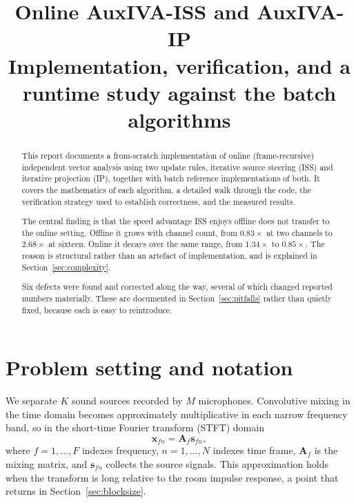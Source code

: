 \documentclass[11pt,a4paper]{article}
\title{\textbf{Online AuxIVA-ISS and AuxIVA-IP}\\[0.3em]
\large Implementation, verification, and a runtime study against the batch algorithms}
\author{}
\date{}
\newcommand{\x}{\boldsymbol{x}}
\begin{document}
\maketitle
\vspace{-2.5em}

\begin{abstract}
\noindent
This report documents a from-scratch implementation of online (frame-recursive)
independent vector analysis using two update rules, iterative source steering
(ISS) and iterative projection (IP), together with batch reference
implementations of both. It covers the mathematics of each algorithm, a detailed
walk through the code, the verification strategy used to establish correctness,
and the measured results.

The central finding is that the speed advantage ISS enjoys offline does not
transfer to the online setting. Offline it grows with channel count, from
$0.83\times$ at two channels to $2.68\times$ at sixteen. Online it decays over
the same range, from $1.34\times$ to $0.85\times$. The reason is structural
rather than an artefact of implementation, and is explained in
Section~\ref{sec:complexity}.

Six defects were found and corrected along the way, several of which changed
reported numbers materially. These are documented in Section~\ref{sec:pitfalls}
rather than quietly fixed, because each is easy to reintroduce.
\end{abstract}

\tableofcontents

\section{Problem setting and notation}

We separate $K$ sound sources recorded by $M$ microphones. Convolutive mixing in
the time domain becomes approximately multiplicative in each narrow frequency
band, so in the short-time Fourier transform (STFT) domain
%
\begin{equation}
\x_{fn} = \boldsymbol{A}_f \boldsymbol{s}_{fn},
\end{equation}
%
where $f = 1,\dots,F$ indexes frequency, $n = 1,\dots,N$ indexes time frame,
$\boldsymbol{A}_f$ is the mixing matrix, and $\boldsymbol{s}_{fn}$ collects the
source signals. This approximation holds when the transform is long relative to
the room impulse response, a point that returns in Section~\ref{sec:blocksize}.
\end{document}
